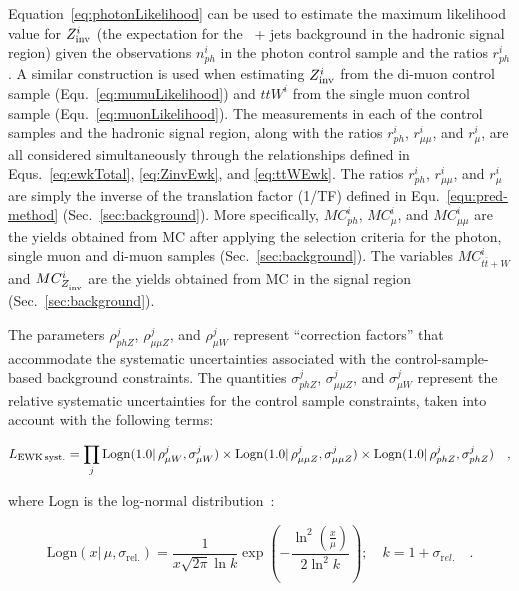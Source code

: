 Equation~\ref{eq:photonLikelihood} can be used to estimate the maximum
likelihood value for $\zInv{i}$ (the expectation for the \znunu\ +
jets background in the hadronic signal region) given the observations
$n_{ph}^i$ in the photon control sample and the ratios $r_{ph}^i$. A
similar construction is used when estimating $\zInv{i}$ from the
di-muon control sample (Equ.~\ref{eq:mumuLikelihood}) and $ttW^{i}$
from the single muon control sample
(Equ.~\ref{eq:muonLikelihood}). The measurements in each of the
control samples and the hadronic signal region, along with the ratios
$r_{ph}^{i}$, $r_{\mu\mu}^{i}$, and $r_{\mu}^{i}$, are all considered
simultaneously through the relationships defined in
Equs.~\ref{eq:ewkTotal}, \ref{eq:ZinvEwk}, and
\ref{eq:ttWEwk}. The ratios $r_{ph}^{i}$, $r_{\mu\mu}^{i}$, and
$r_{\mu}^{i}$ are simply the inverse of the translation factor (1/TF)
defined in Equ.~\ref{equ:pred-method}
(Sec.~\ref{sec:background}). More specifically, $MC_{ph}^i$,
$MC_{\mu}^i$, and $MC_{\mu\mu}^i$ are the yields obtained from MC
after applying the selection criteria for the photon, single muon and
di-muon samples (Sec.~\ref{sec:background}). The variables $MC_{t\bar{t}+W}^i$ and
$MC_{\zInv{}}^i$ are the yields obtained from MC in the signal region 
(Sec.~\ref{sec:background}).

The parameters $\rho_{phZ}^j$, $\rho_{\mu\mu Z}^j$, and $\rho_{\mu
  W}^j$ represent ``correction factors'' that accommodate the
systematic uncertainties associated with the control-sample-based
background constraints.  The quantities $\sigma_{phZ}^j$,
$\sigma_{\mu\mu Z}^j$, and $\sigma_{\mu W}^j$ represent the relative
systematic uncertainties for the control sample constraints, taken
into account with the following terms:

\begin{equation}
\label{eq:ewkSyst}
L_{\rm EWK\, syst.}=\prod_j \mathrm{Logn}( 1.0 |\,\rho_{\mu W}^j,
\sigma_{\mu W}^j)\times \mathrm{Logn}( 1.0 |\,\rho_{\mu\mu Z}^j,
\sigma_{\mu\mu Z}^j)\times \mathrm{Logn}( 1.0 |\,\rho_{phZ}^j,
\sigma_{phZ}^j) \quad ,
\end{equation}

where Logn is the log-normal
distribution~\cite{cousins-log-normal}:

\begin{equation}
\label{eq:log-normal}
\mathrm{Logn}(x |\,\mu,\sigma_{\mathrm{rel.}}) =
\frac{1}{x\sqrt{2\pi}\ln{k}}\exp{\left(-\frac{\ln^2{\left(\frac{x}{\mu}\right)}}{2\ln^2{k}}\right)};\quad
k=1+\sigma_{\mathrm rel.}\quad. 
\end{equation}

